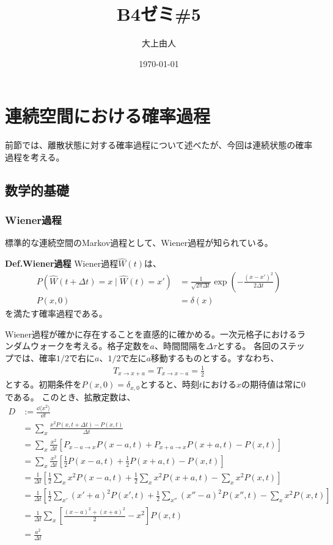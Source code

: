 \documentclass[a4paper,11pt]{jsarticle}
\numberwithin{equation}{section}
\begin{document}
\title{B4ゼミ\#5}
\author{大上由人}
\date{\today}
\maketitle

\setcounter{section}{3}
\section{連続空間における確率過程}
前節では、離散状態に対する確率過程について述べたが、今回は連続状態の確率過程を考える。
\subsection{数学的基礎}
\subsubsection{Wiener過程}
標準的な連続空間のMarkov過程として、Wiener過程が知られている。
\begin{itembox}[l]{\textbf{Def.Wiener過程}}
    Wiener過程$\hat{W}(t)$は、
    \begin{align}
        P(\hat{W}(t+\Delta t)=x \mid \hat{W}(t)=x')& = \frac{1}{\sqrt{2\pi \Delta t}} \exp(-\frac{(x-x')^2}{2\Delta t})\\
        P(x,0)&=\delta(x)
    \end{align}
    を満たす確率過程である。
\end{itembox}
Wiener過程が確かに存在することを直感的に確かめる。一次元格子におけるランダムウォークを考える。格子定数を$a$、時間間隔を$\Delta \tau$とする。
各回のステップでは、確率$1/2$で右に$a$、$1/2$で左に$a$移動するものとする。すなわち、
\begin{align}
    T_{x \to x+a} = T_{x \to x-a} = \frac{1}{2}
\end{align}
とする。初期条件を$P(x,0)=\delta_{x,0}$とすると、時刻$t$における$x$の期待値は常に0である。
このとき、拡散定数は、
\begin{align}
    D &:= \frac{\dd{\langle x^2 \rangle}}{\dd{t}} \\
  &= \sum_{x} \frac{ x^2 P(x,t + \Delta t) - P(x,t)}{\Delta t} \\
  &= \sum_{x} \frac{x^2}{\Delta t} \left[ P_{x-a \rightarrow x} P(x - a, t) + P_{x + a \rightarrow x} P(x + a, t) - P(x,t) \right] \\
  &= \sum_{x} \frac{x^2}{\Delta t} \left[ \frac{1}{2} P(x - a, t) + \frac{1}{2} P(x + a, t) - P(x,t) \right] \\
  &= \frac{1}{\Delta t} \left[ \frac{1}{2} \sum_{x} x^2 P(x - a, t) + \frac{1}{2} \sum_{x} x^2 P(x + a, t) - \sum_{x} x^2 P(x,t) \right] \\
  &= \frac{1}{\Delta t} \left[ \frac{1}{2} \sum_{x'} (x' + a)^2 P(x', t) + \frac{1}{2} \sum_{x''} (x'' - a)^2 P(x'', t) - \sum_{x} x^2 P(x,t) \right] \\
  &= \frac{1}{\Delta t} \sum_{x} \left[ \frac{(x - a)^2 + (x + a)^2}{2} - x^2 \right] P(x,t) \\
  &= \frac{a^2}{\Delta t} 
\end{align}
\end{document}
